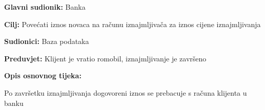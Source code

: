 							\noindent {}
						\begin{packed_item}
							
							\item \textbf{Glavni sudionik: }Banka
							\item  \textbf{Cilj: }Povećati iznos novaca na računu iznajmljivača za iznos cijene iznajmljivanja
							\item  \textbf{Sudionici: }Baza podataka
							\item  \textbf{Preduvjet: }Klijent je vratio romobil, iznajmljivanje je završeno
							\item  \textbf{Opis osnovnog tijeka:}
							
							\item[] \begin{packed_enum}
								
								\item Po završetku iznajmljivanja dogovoreni iznos se prebacuje s računa klijenta u banku 
								
							\end{packed_enum}
						\end{packed_item}
						
